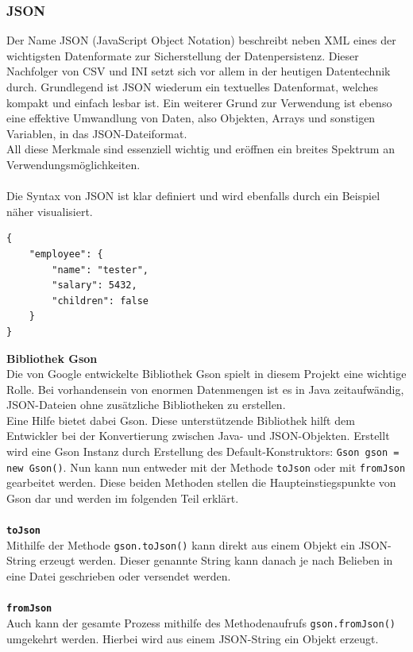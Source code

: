 \subsubsection{JSON}\label{sssec:json}
Der Name JSON (JavaScript Object Notation) beschreibt neben XML eines der wichtigsten Datenformate zur Sicherstellung der Datenpersistenz.
Dieser Nachfolger von CSV und INI setzt sich vor allem in der heutigen Datentechnik durch.
Grundlegend ist JSON wiederum ein textuelles Datenformat, welches kompakt und einfach lesbar ist.
Ein weiterer Grund zur Verwendung ist ebenso eine effektive Umwandlung von Daten, also Objekten, Arrays und sonstigen Variablen, in das JSON-Dateiformat.\\
All diese Merkmale sind essenziell wichtig und eröffnen ein breites Spektrum an Verwendungsmöglichkeiten.\\\\
Die Syntax von JSON ist klar definiert und wird ebenfalls durch ein Beispiel näher visualisiert.
\newpage
\begin{lstlisting}[style=json, caption=JSON-Codebeispiel,label=jsonExample]
{
    "employee": {
        "name": "tester",
        "salary": 5432,
        "children": false
    }
}
\end{lstlisting}
\textbf{Bibliothek Gson}\\
Die von Google entwickelte Bibliothek Gson spielt in diesem Projekt eine wichtige Rolle.
Bei vorhandensein von enormen Datenmengen ist es in Java zeitaufwändig, JSON-Dateien ohne zusätzliche Bibliotheken zu erstellen.\\
Eine Hilfe bietet dabei Gson.
Diese unterstützende Bibliothek hilft dem Entwickler bei der Konvertierung zwischen Java- und JSON-Objekten.
Erstellt wird eine Gson Instanz durch Erstellung des Default-Konstruktors: \lstinline[style=java]{Gson gson = new Gson()}.
Nun kann nun entweder mit der Methode \lstinline{toJson} oder mit \lstinline{fromJson} gearbeitet werden.
Diese beiden Methoden stellen die Haupteinstiegspunkte von Gson dar und werden im folgenden Teil erklärt.
\\\\
\textbf{\lstinline{toJson}}
\\
Mithilfe der Methode \lstinline[style=java]{gson.toJson()} kann direkt aus einem Objekt ein JSON-String erzeugt werden.
Dieser genannte String kann danach je nach Belieben in eine Datei geschrieben oder versendet werden.
\\\\
\textbf{\lstinline{fromJson}}
\\
Auch kann der gesamte Prozess mithilfe des Methodenaufrufs \lstinline[style=java]{gson.fromJson()} umgekehrt werden.
Hierbei wird aus einem JSON-String ein Objekt erzeugt.
